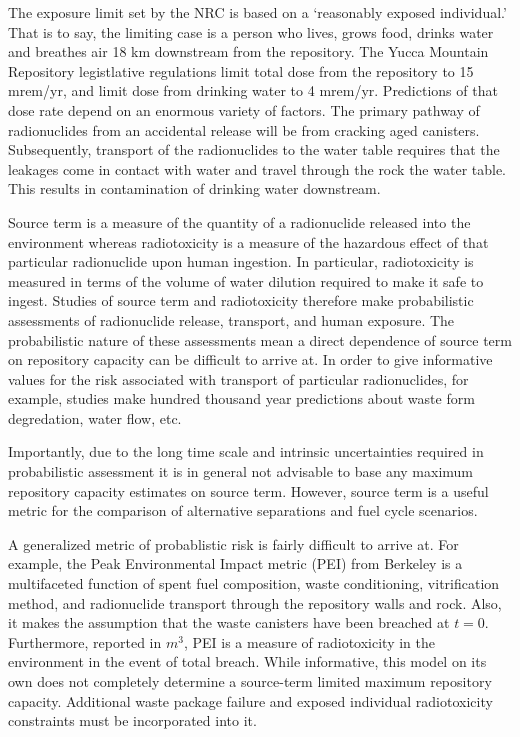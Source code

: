 The exposure limit set by the NRC is based on a `reasonably exposed 
individual.' That is to say, the limiting case is a person who lives, 
grows food, drinks water and breathes air 18 km downstream from the 
repository. The Yucca Mountain Repository legistlative regulations 
limit total dose from the repository to 15 mrem/yr, and limit dose 
from drinking water to 4 mrem/yr.  Predictions of that dose rate 
depend on an enormous variety of factors. The primary pathway of 
radionuclides from an accidental release will be from cracking aged 
canisters. Subsequently, transport of the radionuclides to the water 
table requires that the leakages come in contact with water and travel 
through the rock the water table. This results in contamination of 
drinking water downstream.  

Source term is a measure of the quantity of a radionuclide released 
into the environment whereas radiotoxicity is a measure of the 
hazardous effect of that particular radionuclide upon human ingestion.  
In particular, radiotoxicity is measured in terms of the volume of 
water dilution required to make it safe to ingest. Studies of source 
term and radiotoxicity therefore make probabilistic assessments of 
radionuclide release, transport, and human exposure.  The 
probabilistic nature of these assessments mean a direct dependence of 
source term on repository capacity can be difficult to arrive at. In 
order to give informative values for the risk associated with 
transport of particular radionuclides, for example, studies make 
hundred thousand year predictions about waste form degredation, water 
flow, etc.  

Importantly, due to the long time scale and intrinsic uncertainties 
required in probabilistic assessment it is in general not advisable to 
base any maximum repository capacity estimates on source term.  
However, source term is a useful metric for the comparison of 
alternative separations and fuel cycle scenarios.

A generalized metric of probablistic risk is fairly difficult to 
arrive at. For example, the Peak Environmental Impact metric (PEI) 
from Berkeley \cite{bouvier_comparison_2007} is a multifaceted 
function of spent fuel composition, waste conditioning, vitrification 
method, and radionuclide transport through the repository walls and 
rock.  Also, it makes the assumption that the waste canisters have 
been breached at $t=0$. Furthermore, reported in $m^3$, PEI is a 
measure of radiotoxicity in the environment in the event of total 
breach. While informative, this model on its own does not completely 
determine a source-term limited maximum repository capacity.  
Additional waste package failure and exposed individual radiotoxicity 
constraints must be incorporated into it.

